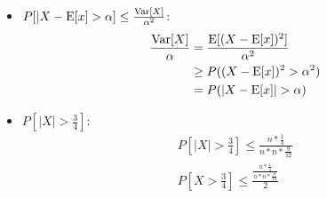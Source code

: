 \begin{itemize}
\item{$P[|X-\mathrm{E}[x]>\alpha] \leq \frac{\mathrm{Var}[X]}{\alpha^2}$:
  \begin{align*}
    \frac{\Var[X]}{\alpha}
     &= \frac{\E[(X-\E[x])^2]}{\alpha^2} \\
     &\ge P((X-\E[x])^2>\alpha^2) \\
     &= P(|X-\E[x]|>\alpha)
  \end{align*}
}
\item{$P[|X|>\frac{3}{4}] $:
	\begin{align*}
	P[|X|>\frac{3}{4}] \le \frac{n*\frac{1}{4}}{n*n*\frac{9}{12}} \\
	P[X>\frac{3}{4}] \le \frac{\frac{n*\frac{1}{4}}{n*n*\frac{9}{12}}}{2}
	\end{align*}
}
\end{itemize}
